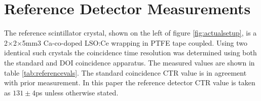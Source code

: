 \section{Reference Detector Measurements}
The reference scintillator crystal, shown on the left of figure \ref{fig:actualsetup}, is a 2×2×5mm3 Ca-co-doped LSO:Ce wrapping in PTFE tape coupled. Using two identical such crystals the coincidence time resolution was determined using both the standard and DOI coincidence apparatus. The measured values are shown in table \ref{tab:referencevals}. The standard coincidence CTR value is in agreement with prior measurement\cite{arron_Meyer_Pauwels_Lecoq_2012}. In this paper the reference detector CTR value is taken as $131\pm4$ps unless otherwise stated.